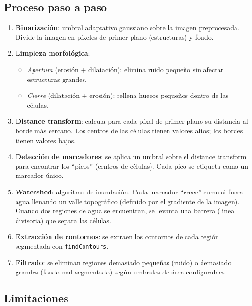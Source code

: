 \documentclass[11pt,a4paper]{article}
\begin{document}
\subsection{Proceso paso a paso}

\begin{enumerate}
  \item \textbf{Binarizaci\'{o}n}: umbral adaptativo gaussiano sobre la imagen preprocesada. Divide la imagen en p\'{i}xeles de primer plano (estructuras) y fondo.

  \item \textbf{Limpieza morfol\'{o}gica}:
  \begin{itemize}
    \item \textit{Apertura} (erosi\'{o}n + dilataci\'{o}n): elimina ruido peque\~{n}o sin afectar estructuras grandes.
    \item \textit{Cierre} (dilataci\'{o}n + erosi\'{o}n): rellena huecos peque\~{n}os dentro de las c\'{e}lulas.
  \end{itemize}

  \item \textbf{Distance transform}: calcula para cada p\'{i}xel de primer plano su distancia al borde m\'{a}s cercano. Los centros de las c\'{e}lulas tienen valores altos; los bordes tienen valores bajos.

  \item \textbf{Detecci\'{o}n de marcadores}: se aplica un umbral sobre el distance transform para encontrar los ``picos'' (centros de c\'{e}lulas). Cada pico se etiqueta como un marcador \'{u}nico.

  \item \textbf{Watershed}: algoritmo de inundaci\'{o}n. Cada marcador ``crece'' como si fuera agua llenando un valle topogr\'{a}fico (definido por el gradiente de la imagen). Cuando dos regiones de agua se encuentran, se levanta una barrera (l\'{i}nea divisoria) que separa las c\'{e}lulas.

  \item \textbf{Extracci\'{o}n de contornos}: se extraen los contornos de cada regi\'{o}n segmentada con \texttt{findContours}.

  \item \textbf{Filtrado}: se eliminan regiones demasiado peque\~{n}as (ruido) o demasiado grandes (fondo mal segmentado) seg\'{u}n umbrales de \'{a}rea configurables.
\end{enumerate}

\subsection{Limitaciones}
\end{document}
